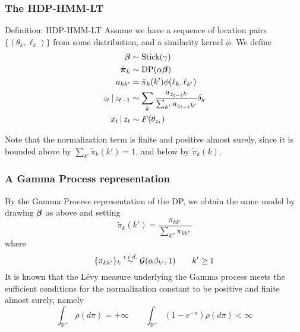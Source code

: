 \documentclass[11pt, serif, mathserif, table,trans]{beamer}
\begin{document}
\begin{frame}
  \frametitle{The HDP-HMM-LT}
  \begin{infoblock}{Definition: HDP-HMM-LT}
    Assume we have a sequence of location pairs $\{(\theta_k, \ell_k)\}$ from some
    distribution, and a similarity kernel $\phi$.  We define
    \begin{align}
      \boldsymbol{\beta} &\sim \mathrm{Stick}(\gamma) \\
      \tilde{\boldsymbol{\pi}}_k &\sim \mathrm{DP}(\alpha\boldsymbol{\beta}) \\
      a_{kk'} &= \tilde{\pi}_{k}(k')\phi(\ell_k, \ell_{k'}) \\
      z_t \, \vert \, z_{t-1} &\sim \sum_{k} \frac{a_{z_{t-1}k}}{\sum_{k'}
        a_{z_{t-1}k'}} \delta_{k} \\
      x_t \, \vert \, z_t &\sim F(\theta_{z_t})
    \end{align}
  \end{infoblock}
  Note that the normalization term is finite and positive almost surely, since it
  is bounded above by $\sum_{k'} \tilde{\pi}_{k}(k') = 1$, and below by $\tilde{\pi}_{k}(k)$.
\end{frame}

\begin{frame}
  \frametitle{A Gamma Process representation}
  By the Gamma Process representation of the DP, we obtain the same
  model by drawing $\boldsymbol{\beta}$ as above and setting
  \begin{equation}
    \label{eq:14}
    \tilde{\pi}_{k}(k') = \frac{\pi_{kk'}}{\sum_{k''} \pi_{kk''}}
  \end{equation}
  where
  \begin{equation}
    \label{eq:15}
    \{\pi_{kk'}\}_{k} \stackrel{i.i.d.}{\sim} \mathcal{G}(\alpha
      \beta_{k'},1) \qquad k' \geq 1
  \end{equation}
  It is known that the L\'evy measure underlying the Gamma process
  meets the sufficient conditions for the normalization constant to be
  positive and finite almost surely, namely
  \begin{equation}
    \label{eq:16}
    \int_{\mathbb{R}^+}\rho(d\pi) = +\infty \qquad \int_{\mathbb{R}^{+}}
    (1 - e^{-\pi}) \rho(d\pi) < \infty
  \end{equation}
\end{frame}
\end{document}

